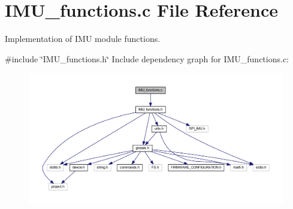 \section{I\+M\+U\+\_\+functions.\+c File Reference}
\label{_i_m_u__functions_8c}


Implementation of I\+MU module functions.  


{\ttfamily \#include \char`\"{}I\+M\+U\+\_\+functions.\+h\char`\"{}}\newline
Include dependency graph for I\+M\+U\+\_\+functions.\+c\+:\nopagebreak
\begin{figure}[H]
\begin{center}
\leavevmode
\includegraphics[width=350pt]{_i_m_u__functions_8c__incl}
\end{center}
\end{figure}
